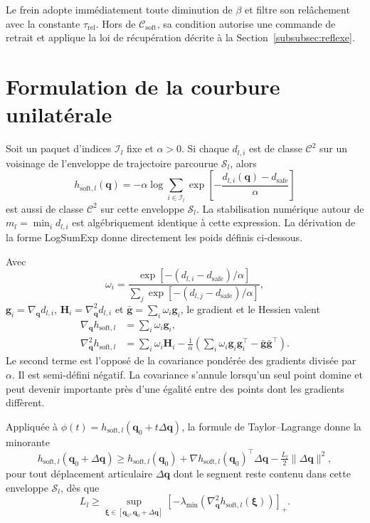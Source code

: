 Le frein adopte immédiatement toute diminution de $\beta$ et filtre son relâchement avec la constante $\tau_{\mathrm{rel}}$. Hors de $\mathcal C_{\mathrm{soft}}$, sa condition autorise une commande de retrait et applique la loi de récupération décrite à la Section~\ref{subsubsec:reflexe}.
\section*{Formulation de la courbure unilatérale}

Soit un paquet d'indices $\mathcal I_l$ fixe et $\alpha>0$. Si chaque $d_{l,i}$ est de classe $\mathcal C^2$ sur un voisinage de l'enveloppe de trajectoire parcourue $\mathcal S_l$, alors
\begin{equation}
h_{\mathrm{soft},l}(\mathbf q)
=-\alpha\log\!\sum_{i\in\mathcal I_l}
\exp\!\left[-\frac{d_{l,i}(\mathbf q)-d_{\mathrm{safe}}}{\alpha}\right]
\end{equation}
est aussi de classe $\mathcal C^2$ sur cette enveloppe $\mathcal S_l$. La stabilisation numérique autour de $m_l=\min_i d_{l,i}$ est algébriquement identique à cette expression. La dérivation de la forme LogSumExp donne directement les poids définis ci-dessous.

Avec
\begin{equation}
\omega_i
=\frac{\exp[-(d_{l,i}-d_{\mathrm{safe}})/\alpha]}
{\sum_j\exp[-(d_{l,j}-d_{\mathrm{safe}})/\alpha]},
\end{equation}
$\mathbf g_i=\nabla_{\mathbf q}d_{l,i}$, $\mathbf H_i=\nabla^2_{\mathbf q}d_{l,i}$ et $\bar{\mathbf g}=\sum_i\omega_i\mathbf g_i$, le gradient et le Hessien valent
\begin{align}
\nabla_{\mathbf q}h_{\mathrm{soft},l}
&=\sum_i\omega_i\mathbf g_i,\\
\nabla^2_{\mathbf q}h_{\mathrm{soft},l}
&=\sum_i\omega_i\mathbf H_i
-\frac{1}{\alpha}
\left(\sum_i\omega_i\mathbf g_i\mathbf g_i^\top
-\bar{\mathbf g}\bar{\mathbf g}^\top\right).
\label{eq:softmin_hessian}
\end{align}
Le second terme est l'opposé de la covariance pondérée des gradients divisée par $\alpha$. Il est semi-défini négatif. La covariance s'annule lorsqu'un seul point domine et peut devenir importante près d'une égalité entre des points dont les gradients diffèrent.

Appliquée à $\phi(t)=h_{\mathrm{soft},l}(\mathbf q_0+t\Delta\mathbf q)$, la formule de Taylor--Lagrange donne la minorante
\begin{equation}
h_{\mathrm{soft},l}(\mathbf{q}_0+\Delta\mathbf{q})
\geq h_{\mathrm{soft},l}(\mathbf{q}_0)
+\nabla h_{\mathrm{soft},l}(\mathbf q_0)^\top\Delta\mathbf q
-\tfrac{L_l}{2}\|\Delta\mathbf q\|^2,
\end{equation}
pour tout déplacement articulaire $\Delta\mathbf q$ dont le segment reste contenu dans cette enveloppe $\mathcal S_l$, dès que
\begin{equation}\label{eq:L_requis}
L_l \geq \sup_{\boldsymbol{\xi}\in[\mathbf q_0,\mathbf q_0+\Delta\mathbf q]}
\left[-\lambda_{\min}\!\left(
\nabla^2_{\mathbf q}h_{\mathrm{soft},l}(\boldsymbol{\xi})
\right)\right]_+.
\end{equation}

